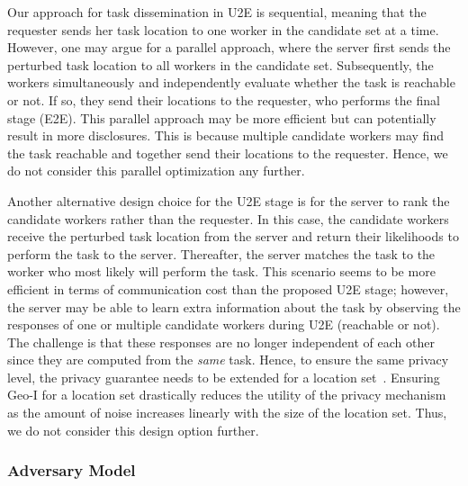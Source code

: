 \documentclass{USC-Thesis}
\numberwithin{equation}{chapter}
\begin{document}
Our approach for task dissemination in U2E is sequential, meaning that the requester sends her task location to one worker in the candidate set at a time. However, one may argue for a parallel approach, where the server first sends the perturbed task location to all workers in the candidate set. Subsequently, the workers simultaneously and independently evaluate whether the task is reachable or not. If so, they send their locations to the requester, who performs the final stage (E2E). This parallel approach may be more efficient but can potentially result in more disclosures. This is because multiple candidate workers may find the task reachable and together send their locations to the requester. Hence, we do not consider this parallel optimization any further.
%

Another alternative design choice for the U2E stage is for the server to rank the candidate workers rather than the requester. In this case, the candidate workers receive the perturbed task location from the server and return their likelihoods to perform the task to the server. Thereafter, the server matches the task to the worker who most likely will perform the task. This scenario seems to be more efficient in terms of communication cost than the proposed U2E stage; however, the server may be able to learn extra information about the task by observing the responses of one or multiple candidate workers during U2E (reachable or not). The challenge is that these responses are no longer independent of each other since they are computed from the \emph{same} task. Hence, to ensure the same privacy level, the privacy guarantee needs to be extended for a location set~\cite{andres2013geo}. Ensuring Geo-I for a location set drastically reduces the utility of the privacy mechanism as the amount of noise increases linearly with the size of the location set. Thus, we do not consider this design option further.

\subsubsection{Adversary Model}
\end{document}
